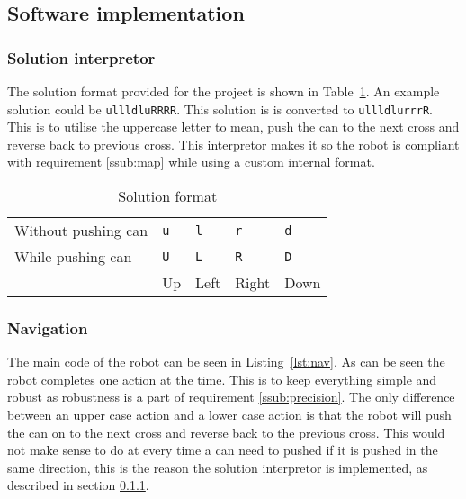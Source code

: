 \documentclass[../../main.tex]{subfiles}
\begin{document}
\subsection{Software implementation}%
\label{sub:software_implementation}

\subsubsection{Solution interpretor}%
\label{ssub:solution_intepretor}

The solution format provided for the project is shown in Table~\ref{tab:solution_format}.
An example solution could be \texttt{ullldluRRRR}.
This solution is is converted to \texttt{ullldlurrrR}. This is to utilise the uppercase letter to
mean, push the can to the next cross and reverse back to previous cross.
This interpretor makes it so the robot is compliant with requirement \ref{ssub:map} while using
a custom internal format.

\begin{table}[h]
	\centering
	\caption{Solution format}
	\label{tab:solution_format}
	\begin{tabular}{*{5}{l}}
		\toprule
		Without pushing can & \tt u &\tt  l & \tt r & \tt d \\
		While pushing can & \tt U & \tt L & \tt R & \tt D \\
		\cmidrule{2-5}
											& Up & Left & Right & Down\\
											\bottomrule
	\end{tabular}
\end{table}


\subsubsection{Navigation}%
\label{ssub:navigation}

The main code of the robot can be seen in Listing~\ref{lst:nav}.
As can be seen the robot completes one action at the time.
This is to keep everything simple and robust
as robustness is a part of requirement \ref{ssub:precision}.
The only difference between an upper case action and a lower case action
is that the robot will push the can on to the next cross and reverse back to the previous
cross. This would not make sense to do at every time a can need to pushed if it is pushed in
the same direction, this is the reason the solution interpretor is implemented, as described in
section \ref{ssub:solution_intepretor}.
\end{document}
